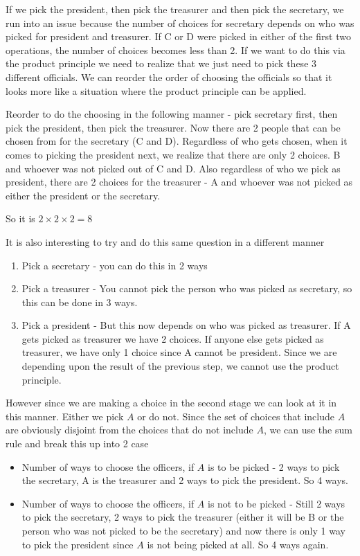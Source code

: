 \documentclass[12pt]{article}
\begin{document}
If we pick the president, then pick the treasurer and then pick the secretary, we run into an issue because the number of choices for secretary depends on who was picked for president and treasurer. If C or D were picked in either of the first two operations, the number of choices becomes less than 2. If we want to do this via the product principle we need to realize that we just need to pick these 3 different officials. We can reorder the order of choosing the officials so that it looks more like a situation where the product principle can be applied. 

Reorder to do the choosing in the following manner - pick secretary first, then pick the president, then pick the treasurer. Now there are 2 people that can be chosen from for the secretary (C and D). Regardless of who gets chosen, when it comes to picking the president next, we realize that there are only 2 choices. B and whoever was not picked out of C and D. Also regardless of who we pick as president, there are 2 choices for the treasurer - A and whoever was not picked as either the president or the secretary.

So it is $2 \times 2 \times 2 = 8$

It is also interesting to try and do this same question in a different manner
\begin{enumerate}
\item Pick a secretary - you can do this in 2 ways
\item Pick a treasurer - You cannot pick the person who was picked as secretary, so this can be done in 3 ways.
\item Pick a president - But this now depends on who was picked as treasurer. If A gets picked as treasurer we have 2 choices. If anyone else gets picked as treasurer, we have only 1 choice since A cannot be president. Since we are depending upon the result of the previous step, we cannot use the product principle. 
\end{enumerate}

However since we are making a choice in the second stage we can look at it in this manner. Either we pick $A$ or do not. Since the set of choices that include $A$ are obviously disjoint from the choices that do not include $A$, we can use the sum rule and break this up into 2 case

\begin{itemize}
\item Number of ways to choose the officers, if $A$ is to be picked - 2 ways to pick the secretary, A is the treasurer and 2 ways to pick the president. So 4 ways. 

\item Number of ways to choose the officers, if $A$ is not to be picked - Still 2 ways to pick the secretary, 2 ways to pick the treasurer (either it will be B or the person who was not picked to be the secretary) and now there is only 1 way to pick the president since $A$ is not being picked at all. So 4 ways again.

\end{itemize}
\end{document}
